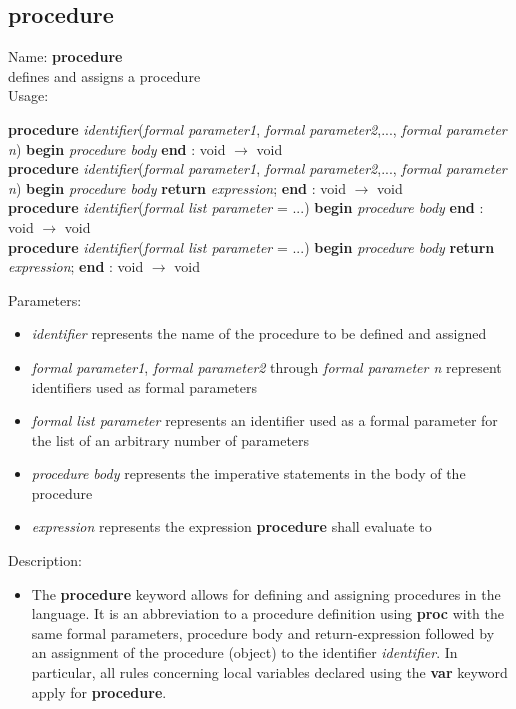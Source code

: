 \subsection{procedure}
\label{labprocedure}
\noindent Name: \textbf{procedure}\\
defines and assigns a \sollya procedure\\
\noindent Usage: 
\begin{center}
\textbf{procedure} \emph{identifier}(\emph{formal parameter1}, \emph{formal parameter2},..., \emph{formal parameter n}) \textbf{begin} \emph{procedure body} \textbf{end} : \textsf{void} $\rightarrow$ \textsf{void}\\
\textbf{procedure} \emph{identifier}(\emph{formal parameter1}, \emph{formal parameter2},..., \emph{formal parameter n}) \textbf{begin} \emph{procedure body} \textbf{return} \emph{expression}; \textbf{end} : \textsf{void} $\rightarrow$ \textsf{void}\\
\textbf{procedure} \emph{identifier}(\emph{formal list parameter} = ...) \textbf{begin} \emph{procedure body} \textbf{end} : \textsf{void} $\rightarrow$ \textsf{void}\\
\textbf{procedure} \emph{identifier}(\emph{formal list parameter} = ...) \textbf{begin} \emph{procedure body} \textbf{return} \emph{expression}; \textbf{end} : \textsf{void} $\rightarrow$ \textsf{void}\\
\end{center}
Parameters: 
\begin{itemize}
\item \emph{identifier} represents the name of the procedure to be defined and assigned
\item \emph{formal parameter1}, \emph{formal parameter2} through \emph{formal parameter n} represent identifiers used as formal parameters
\item \emph{formal list parameter} represents an identifier used as a formal parameter for the list of an arbitrary number of parameters
\item \emph{procedure body} represents the imperative statements in the body of the procedure
\item \emph{expression} represents the expression \textbf{procedure} shall evaluate to
\end{itemize}
\noindent Description: \begin{itemize}

\item The \textbf{procedure} keyword allows for defining and assigning procedures in
   the \sollya language. It is an abbreviation to a procedure definition
   using \textbf{proc} with the same formal parameters, procedure body and
   return-expression followed by an assignment of the procedure (object)
   to the identifier \emph{identifier}. In particular, all rules concerning
   local variables declared using the \textbf{var} keyword apply for \textbf{procedure}.
\end{itemize}
